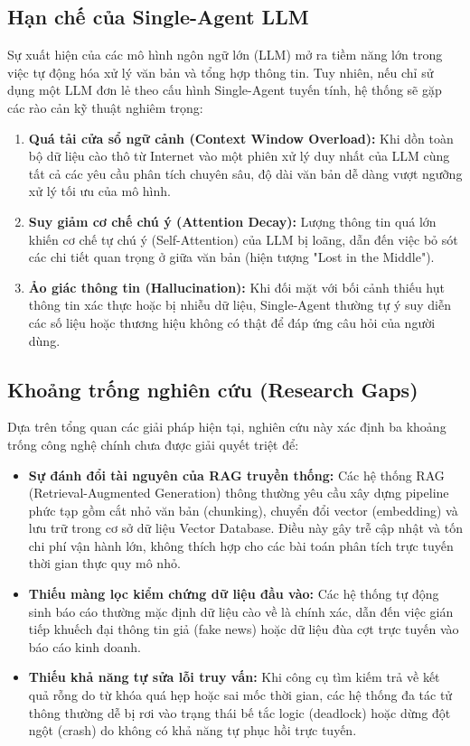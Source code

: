 \documentclass[11pt,a4paper]{article}
\begin{document}
\subsection{Hạn chế của Single-Agent LLM}
Sự xuất hiện của các mô hình ngôn ngữ lớn (LLM) mở ra tiềm năng lớn trong việc tự động hóa xử lý văn bản và tổng hợp thông tin. Tuy nhiên, nếu chỉ sử dụng một LLM đơn lẻ theo cấu hình Single-Agent tuyến tính, hệ thống sẽ gặp các rào cản kỹ thuật nghiêm trọng:
\begin{enumerate}
    \item \textbf{Quá tải cửa sổ ngữ cảnh (Context Window Overload):} Khi dồn toàn bộ dữ liệu cào thô từ Internet vào một phiên xử lý duy nhất của LLM cùng tất cả các yêu cầu phân tích chuyên sâu, độ dài văn bản dễ dàng vượt ngưỡng xử lý tối ưu của mô hình.
    \item \textbf{Suy giảm cơ chế chú ý (Attention Decay):} Lượng thông tin quá lớn khiến cơ chế tự chú ý (Self-Attention) của LLM bị loãng, dẫn đến việc bỏ sót các chi tiết quan trọng ở giữa văn bản (hiện tượng "Lost in the Middle").
    \item \textbf{Ảo giác thông tin (Hallucination):} Khi đối mặt với bối cảnh thiếu hụt thông tin xác thực hoặc bị nhiễu dữ liệu, Single-Agent thường tự ý suy diễn các số liệu hoặc thương hiệu không có thật để đáp ứng câu hỏi của người dùng.
\end{enumerate}

\subsection{Khoảng trống nghiên cứu (Research Gaps)}
Dựa trên tổng quan các giải pháp hiện tại, nghiên cứu này xác định ba khoảng trống công nghệ chính chưa được giải quyết triệt để:
\begin{itemize}
    \item \textbf{Sự đánh đổi tài nguyên của RAG truyền thống:} Các hệ thống RAG (Retrieval-Augmented Generation) thông thường yêu cầu xây dựng pipeline phức tạp gồm cắt nhỏ văn bản (chunking), chuyển đổi vector (embedding) và lưu trữ trong cơ sở dữ liệu Vector Database. Điều này gây trễ cập nhật và tốn chi phí vận hành lớn, không thích hợp cho các bài toán phân tích trực tuyến thời gian thực quy mô nhỏ.
    \item \textbf{Thiếu màng lọc kiểm chứng dữ liệu đầu vào:} Các hệ thống tự động sinh báo cáo thường mặc định dữ liệu cào về là chính xác, dẫn đến việc gián tiếp khuếch đại thông tin giả (fake news) hoặc dữ liệu đùa cợt trực tuyến vào báo cáo kinh doanh.
    \item \textbf{Thiếu khả năng tự sửa lỗi truy vấn:} Khi công cụ tìm kiếm trả về kết quả rỗng do từ khóa quá hẹp hoặc sai mốc thời gian, các hệ thống đa tác tử thông thường dễ bị rơi vào trạng thái bế tắc logic (deadlock) hoặc dừng đột ngột (crash) do không có khả năng tự phục hồi trực tuyến.
\end{itemize}
\end{document}
